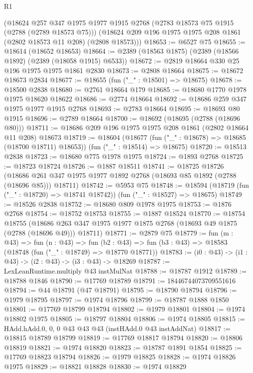 \begin{lexlean}{R1}
\begin{coremodule}
    (@18624
      @257
      @347
      @1975
      @1977
      @1915
      @2768
      (@2783 @18573 @75 @1915 (@2788 (@2789 @18573 @75)))
      (@18624 @209 @196 @1975 @1975 @208 @1861 (@2802 @18573 @11 @208) (@2808 @18573)))
@18653 := @6527 @75
@18655 := @18614 (@18652 @18653)
@18664 := @2389 (@18563 @1875) (@2389 (@18566 @1892) (@2389 (@18058 @1915) @6533))
@18672 := @2819 @18664 @330 @25 @196 @1975 @1975 @1861 @2830
@18673 := @2808 @18664
@18675 := @18672 @18673 @2834
@18677 := @18655 (fun ("_" : @18501) => @18675)
@18678 := @18500 @2838
@18680 := @2761 @18664 @179
@18685 := @18680 @1770 @1978 @1975 @18620 @18622
@18686 := @2774 @18664
@18692 := @18686 @259 @347 @1975 @1977 @1915 @2768
@18693 := @2783 @18664
@18695 := @18693 @80 @1915
@18696 := @2789 @18664
@18700 := @18692 (@18695 (@2788 (@18696 @80)))
@18711 := @18686 @209 @196 @1975 @1975 @208 @1861 (@2802 @18664 @11 @208) @18673
@18719 := @18604
    (@18677 (fun ("_" : @18678) => @18685 (@18700 @18711) @18653))
    (fun ("_" : @18514) => @18675)
@18720 := @18513 @2838
@18723 := @18680 @775 @1978 @1975
@18724 := @1893 @2768
@18725 := @18723 @18724
@18726 := @1887 @18511
@18741 := @18725
    @18726
    (@18686 @261 @347 @1975 @1977 @1892 @2768 (@18693 @85 @1892 (@2788 (@18696 @85))) @18711)
@18742 := @5953 @75
@18748 := @18594 (@18719 (fun ("_" : @18720) => @18741 @18742)) (fun ("_" : @18527) => @18675)
@18749 := @18526 @2838
@18752 := @18680 @809 @1978 @1975
@18753 := @1876 @2768
@18754 := @18752 @18753
@18755 := @1887 @18524
@18770 := @18754
    @18755
    (@18686 @263 @347 @1975 @1977 @1875 @2768 (@18693 @49 @1875 (@2788 (@18696 @49))) @18711)
@18771 := @2879 @75
@18779 := fun (m : @43) =>
  fun (n : @43) =>
  fun (b2 : @43) => fun (b3 : @43) => @18583 (@18748 (fun ("_" : @18749) => @18770 @18771))
@18783 := (i0 : @43) -> (i1 : @43) -> (i2 : @43) -> (i3 : @43) -> @18269
@18787 := LexLeanRuntime.multiply @43 instMulNat
@18788 := @18787 @1912
@18789 := @18788 @1846
@18790 := @17769 @18789
@18791 := 18446744073709551616
@18794 := @44 @18791 (@47 @18791)
@18795 := @18790 @18794
@18796 := @1979 @18795
@18797 := @1974 @18796
@18799 := @18787 @1888 @1850
@18801 := @17769 @18799 @18794
@18802 := @1979 @18801
@18804 := @1974 @18802 @1975
@18805 := @18797 @18804
@18806 := @1974 @18805
@18815 := HAdd.hAdd.{0, 0, 0} @43 @43 @43 (instHAdd.{0} @43 instAddNat)
@18817 := @18815 @18789 @18799
@18819 := @17769 @18817 @18794
@18820 := @18806 @18819
@18821 := @1974 @18820
@18823 := @18787 @1891 @1854
@18825 := @17769 @18823 @18794
@18826 := @1979 @18825
@18828 := @1974 @18826 @1975
@18829 := @18821 @18828
@18830 := @1974 @18829

\end{coremodule}
\end{lexlean}
